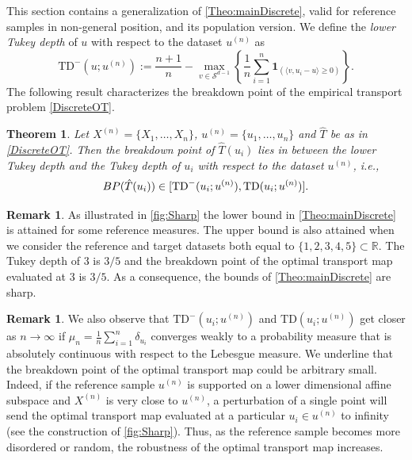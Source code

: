 \documentclass[11pt]{article}
\newcommand{\R}{\mathbb{R}}
\theoremstyle{plain}
\newtheorem{theorem}[sectioncount]{Theorem}
\theoremstyle{definition}
\newtheorem{remark}[sectioncount]{Remark}
\begin{document}
This section contains a generalization of \autoref{Theo:mainDiscrete}, valid for reference samples in non-general position,  and  its population version.  We define the {\it lower Tukey depth} of $u$ with respect to the dataset $u^{(n)}$ as 
%
\[
\mathrm{TD}^-(u; u^{(n)}):= \frac{n+1}{n}-\max_{v\in \mathcal{S}^{d-1}} \left\{ \frac{1}{n} \sum_{i=1}^{n} \mathbf{1}_{\left( \langle v, u_i - u \rangle \geq 0 \right)} \right\}.
\]
%
The following result characterizes the breakdown point of the empirical transport problem \eqref{DiscreteOT}.
%
\begin{theorem}    \label{Theo:mainDiscrete2}
    Let $X^{(n)}=\{X_1, \dots, X_n\}$, $u^{(n)}=\{u_1, \dots, u_n\}$ and $\hat{T}$ be as in \eqref{DiscreteOT}. Then the breakdown point of $\hat{T}(u_i)$ lies in between  the lower Tukey depth and the Tukey depth of $u_i$ with respect to the dataset $u^{(n)}$, i.e.,   
    $$
    {\rm BP}(\hat{T}(u_i))\in [\mathrm{TD}^{-}(u_i; u^{(n)}),\mathrm{TD}(u_i; u^{(n)})].
$$
\end{theorem}
%
\begin{remark}\label{Rem:sharpness}
    As illustrated in \autoref{fig:Sharp} the lower bound in \autoref{Theo:mainDiscrete} is attained for some reference measures. The upper bound is also attained when we consider the reference and target datasets both equal to  $\{1,2,3,4,5\}\subset \R$. The Tukey depth of $3$ is $3/5$ and the breakdown point of the optimal transport map evaluated at $ 3$ is $3/5$. As a consequence, the bounds of \autoref{Theo:mainDiscrete}  are sharp. 
\end{remark}
%
\begin{remark}\label{Remark:ArbitralyBad}
    We also observe that  $ \mathrm{TD}^{-}(u_i;u^{(n)})$ and $\mathrm{TD}(u_i; u^{(n)})$ get closer as $n\to \infty$ if $\mu_n=\frac{1}{n}\sum_{i=1}^n\delta_{u_i}$ converges weakly to a probability measure that is absolutely continuous  with respect to  the Lebesgue measure. We underline that the breakdown point of the optimal transport map could be arbitrary small. Indeed,  if the reference sample $u^{(n)}$ is supported on a lower dimensional affine subspace and $X^{(n)}$ is very close to $u^{(n)}$,   a perturbation of  {a} single point will send  the optimal transport map evaluated at a particular $ u_i\in u^{(n)} $ to infinity  (see the construction of \autoref{fig:Sharp}). Thus, as the reference sample becomes more disordered or random, the robustness of the optimal transport map increases.
\end{remark}
\end{document}

